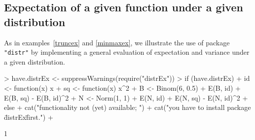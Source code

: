 \documentclass[11pt]{article}
\newcommand{\pkg}[1]{{\tt "#1"}}
\begin{document}
\subsection{Expectation of a given function under a given distribution}
\begin{small}
As in examples~\ref{truncex} and \ref{minmaxex}, we illustrate the use of package {\tt "distr"} by implementing
a general evaluation of expectation and variance under a given distribution.
\end{small}
\begin{Schunk}
\begin{Sinput}
> have.distrEx <- suppressWarnings(require("distrEx"))
> if (have.distrEx) {
+     id <- function(x) x
+     sq <- function(x) x^2
+     B <- Binom(6, 0.5)
+     E(B, id)
+     E(B, sq) - E(B, id)^2
+     N <- Norm(1, 1)
+     E(N, id)
+     E(N, sq) - E(N, id)^2
+ } else {
+     cat("\n functionality not (yet) available; ")
+     cat("you have to install package \"distrEx\" first.\n")
+ }
\end{Sinput}
\begin{Soutput}
[1] 1
\end{Soutput}
\end{Schunk}
\end{document}
